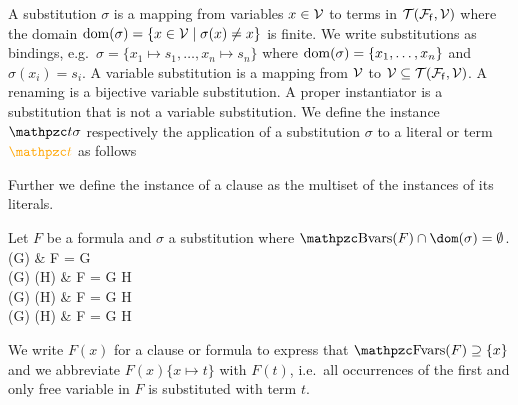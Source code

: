 


\begin{definition}\label{def:substitution}
	A {\myem substitution} $\sigma$ is a mapping from variables $x\in{\mathcal V}$ to terms in ${{\mathcal T}({\mathcal F}_{\mathsf f},{\mathcal V})}$
	where the {\myem domain }$\operatorname{dom}(\sigma) = \{ x\in{\mathcal V}\mid\sigma(x) \neq x \}$ is finite.
	We write substitutions as bindings, e.g.~$\sigma=\{ x_1\mapsto s_1,\ldots,x_n\mapsto s_n \}$
	where $\operatorname{dom}(\sigma)=\{ x_1,\ldots,x_n \}$ and $\sigma(x_i)=s_i$.
	A {\myem variable substitution} is a mapping from ${\mathcal V}$ to ${\mathcal V}\subseteq{{\mathcal T}({\mathcal F}_{\mathsf f},{\mathcal V})}$.
	A {\myem renaming} is a bijective variable substitution.
	A {\myem proper instantiator} is a substitution that is not a variable substitution.
	We define the instance $\mct\sigma$ 
	respectively the application of a substitution $\sigma$ to a literal or term $\foxt$ as follows

\noindent Further we define the instance of a clause as the multiset of the instances of its literals.

\begin{definition}
	Let $F$ be a formula and $\sigma$ a substitution
	where $\bvar(F)\cap\dom(\sigma) = \emptyset$.
{
		\lnot(G\sigma) & F = \lnot G\\
		(G\sigma) \land (H\sigma) & F = G \land H\\
		(G\sigma) \lor (H\sigma) & F = G \lor H\\
		(G\sigma) \limp (H\sigma) & F = G \limp H\\
	}
\end{definition}

\begin{remark}[\OBSOLETE] 
	We write $F(x)$ for a clause or formula to express that $\fvar(F) \supseteq \{ x \}$
	and we abbreviate $F(x)\{x\mapsto t\}$ with $F(t)$, i.e.~all occurrences 
	of the first and only free variable in $F$ is substituted with term $t$.
\end{remark}


\end{definition}

